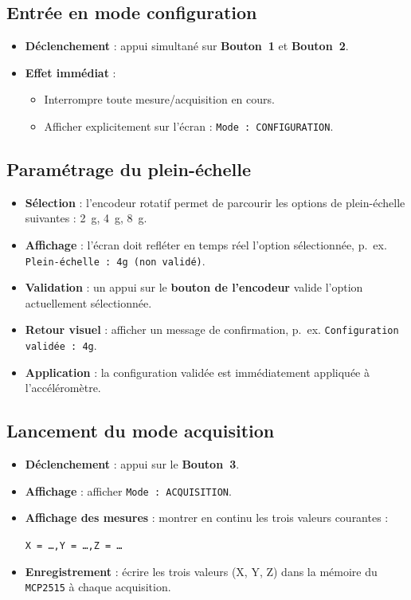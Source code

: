 \documentclass[11pt]{paper}
\begin{document}
\subsection{Entrée en mode configuration}
\begin{itemize}
  \item \textbf{Déclenchement} : appui simultané sur \textbf{Bouton~1} et \textbf{Bouton~2}.
  \item \textbf{Effet immédiat} :
    \begin{itemize}
      \item Interrompre toute mesure/acquisition en cours.
      \item Afficher explicitement sur l'écran : \texttt{Mode : CONFIGURATION}.
    \end{itemize}
\end{itemize}

\subsection{Paramétrage du plein-échelle}
\begin{itemize}
  \item \textbf{Sélection} : l'encodeur rotatif permet de parcourir les options de plein-échelle suivantes : \SI{2}{g}, \SI{4}{g}, \SI{8}{g}.
  \item \textbf{Affichage} : l'écran doit refléter en temps réel l'option sélectionnée, p.~ex. \texttt{Plein-échelle : 4g (non validé)}.
  \item \textbf{Validation} : un appui sur le \textbf{bouton de l'encodeur} valide l'option actuellement sélectionnée.
  \item \textbf{Retour visuel} : afficher un message de confirmation, p.~ex. \texttt{Configuration validée : 4g}.
  \item \textbf{Application} : la configuration validée est immédiatement appliquée à l'accéléromètre.
\end{itemize}

\subsection{Lancement du mode acquisition}
\begin{itemize}
  \item \textbf{Déclenchement} : appui sur le \textbf{Bouton~3}.
  \item \textbf{Affichage} : afficher \texttt{Mode : ACQUISITION}.
  \item \textbf{Affichage des mesures} : montrer en continu les trois valeurs courantes :
        \begin{center}
          \texttt{X = \dots,\quad Y = \dots,\quad Z = \dots}
        \end{center}
  \item \textbf{Enregistrement} : écrire les trois valeurs (X, Y, Z) dans la mémoire du \texttt{MCP2515} à chaque acquisition.
\end{itemize}
\end{document}
